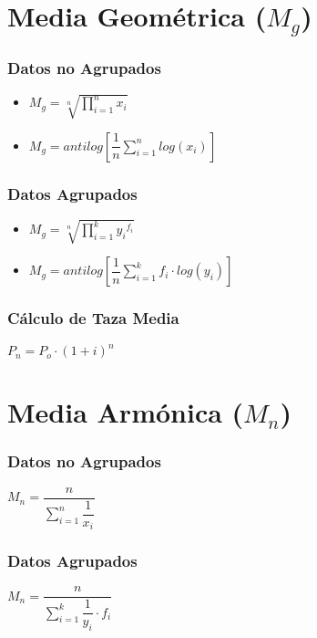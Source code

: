 \documentclass[10pt,letterpaper]{article}
\begin{document}
\section{Media Geométrica ($M_g$)}

\begin{multicols}{3}
\subsubsection*{Datos no Agrupados}
\begin{itemize}
\item $M_g=\sqrt[n]{\displaystyle\prod_{i=1}^{n} x_i}$
\item $M_g=antilog\left[ \dfrac{1}{n}\displaystyle\sum_{i=1}^{n}log(x_i) \right]$
\end{itemize}
\columnbreak
\subsubsection*{Datos Agrupados}
\begin{itemize}
\item $M_g=\sqrt[n]{\displaystyle\prod_{i=1}^{k} {y_i}^{f_i}}$
\item $M_g=antilog\left[ \dfrac{1}{n}\displaystyle\sum_{i=1}^{k}f_i\cdot log(y_i) \right]$
\end{itemize}
\columnbreak
\subsubsection*{Cálculo de Taza Media}
$P_n=P_o\cdot (1+i)^n$
\end{multicols}

\section{Media Armónica ($M_n$)}

\begin{multicols}{2}
\subsubsection*{Datos no Agrupados}
$M_n=\dfrac{n}{\displaystyle\sum_{i=1}^{n} \dfrac{1}{x_i}}$
\columnbreak
\subsubsection*{Datos Agrupados}
$M_n=\dfrac{n}{\displaystyle\sum_{i=1}^{k} \dfrac{1}{y_i}\cdot f_i}$
\end{multicols}
\end{document}
